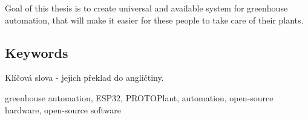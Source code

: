\documentclass{template/socthesis}
\begin{document}
Goal of this thesis is to create universal and available system for greenhouse automation, that will make it easier for these people to take care of their plants.

\subsection*{Keywords}
\color{mygreen}
Klíčová slova - jejich překlad do angličtiny.
\color{black}

greenhouse automation, ESP32, PROTOPlant, automation, open-source hardware, open-source software

\newpage
\pagestyle{plain}

\tableofcontents %

\setcounter{figure}{0}
\setcounter{table}{0}
\newpage



% 
















 

















\newpage



\appendix
{}






% 


% 


% 



\printbibliography[title=Literatura]


\listoffigures
{}

\listoftables
{}
\end{document}

